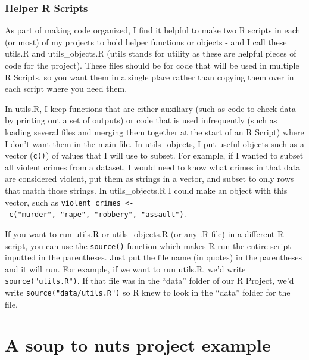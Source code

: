 \documentclass[
]{krantz}
\begin{document}
\hypertarget{helper-r-scripts}{%
\subsection{Helper R Scripts}\label{helper-r-scripts}}

As part of making code organized, I find it helpful to make two R scripts in each (or most) of my projects to hold helper functions or objects - and I call these utils.R and utils\_objects.R (utils stands for utility as these are helpful pieces of code for the project). These files should be for code that will be used in multiple R Scripts, so you want them in a single place rather than copying them over in each script where you need them.

In utils.R, I keep functions that are either auxiliary (such as code to check data by printing out a set of outputs) or code that is used infrequently (such as loading several files and merging them together at the start of an R Script) where I don't want them in the main file. In utils\_objects, I put useful objects such as a vector (\texttt{c()}) of values that I will use to subset. For example, if I wanted to subset all violent crimes from a dataset, I would need to know what crimes in that data are considered violent, put them as strings in a vector, and subset to only rows that match those strings. In utils\_objects.R I could make an object with this vector, such as \texttt{violent\_crimes\ \textless{}-\ c("murder",\ "rape",\ "robbery",\ "assault")}.

If you want to run utils.R or utils\_objects.R (or any .R file) in a different R script, you can use the \texttt{source()} function which makes R run the entire script inputted in the parentheses. Just put the file name (in quotes) in the parentheses and it will run. For example, if we want to run utils.R, we'd write \texttt{source("utils.R")}. If that file was in the ``data'' folder of our R Project, we'd write \texttt{source("data/utils.R")} so R knew to look in the ``data'' folder for the file.

\hypertarget{a-soup-to-nuts-project-example}{%
\chapter{A soup to nuts project example}\label{a-soup-to-nuts-project-example}}
\end{document}
